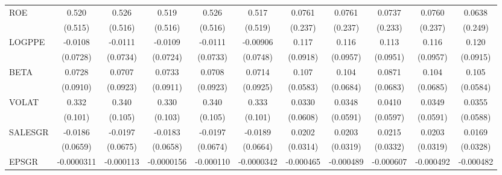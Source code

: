\begin{table}[htbp]
\begin{tabular}{l*{10}{c}}
ROE             &    0.520         &    0.526         &    0.519         &    0.526         &    0.517         &   0.0761         &   0.0761         &   0.0737         &   0.0760         &   0.0638         \\
                &  (0.515)         &  (0.516)         &  (0.516)         &  (0.516)         &  (0.519)         &  (0.237)         &  (0.237)         &  (0.233)         &  (0.237)         &  (0.249)         \\
LOGPPE          &  -0.0108         &  -0.0111         &  -0.0109         &  -0.0111         & -0.00906         &    0.117         &    0.116         &    0.113         &    0.116         &    0.120         \\
                & (0.0728)         & (0.0734)         & (0.0724)         & (0.0733)         & (0.0748)         & (0.0918)         & (0.0957)         & (0.0951)         & (0.0957)         & (0.0915)         \\
BETA            &   0.0728         &   0.0707         &   0.0733         &   0.0708         &   0.0714         &    0.107\sym{*}  &    0.104         &   0.0871         &    0.104         &    0.105\sym{*}  \\
                & (0.0910)         & (0.0923)         & (0.0911)         & (0.0923)         & (0.0925)         & (0.0583)         & (0.0684)         & (0.0683)         & (0.0685)         & (0.0584)         \\
VOLAT           &    0.332\sym{***}&    0.340\sym{***}&    0.330\sym{***}&    0.340\sym{***}&    0.333\sym{***}&   0.0330         &   0.0348         &   0.0410         &   0.0349         &   0.0355         \\
                &  (0.101)         &  (0.105)         &  (0.103)         &  (0.105)         &  (0.101)         & (0.0608)         & (0.0591)         & (0.0597)         & (0.0591)         & (0.0588)         \\
SALESGR         &  -0.0186         &  -0.0197         &  -0.0183         &  -0.0197         &  -0.0189         &   0.0202         &   0.0203         &   0.0215         &   0.0203         &   0.0169         \\
                & (0.0659)         & (0.0675)         & (0.0658)         & (0.0674)         & (0.0664)         & (0.0314)         & (0.0319)         & (0.0332)         & (0.0319)         & (0.0328)         \\
EPSGR           &-0.0000311         &-0.000113         &-0.0000156         &-0.000110         &-0.0000342         &-0.000465         &-0.000489         &-0.000607         &-0.000492         &-0.000482         \\

\end{tabular}
\end{table}
